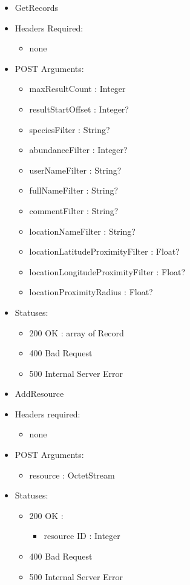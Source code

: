 \begin{itemize}
        \item GetRecords
        \item Headers Required:
        \begin{itemize}
        	\item none
        \end{itemize}
        \item POST Arguments:
        \begin{itemize}
            \item maxResultCount : Integer
            \item resultStartOffset : Integer?
        	\item speciesFilter : String?
            \item abundanceFilter : Integer?
            \item userNameFilter : String?
            \item fullNameFilter : String?
            \item commentFilter : String?
            \item locationNameFilter : String?
            \item locationLatitudeProximityFilter : Float?
            \item locationLongitudeProximityFilter : Float?
            \item locationProximityRadius : Float?
        \end{itemize}
        \item Statuses: 
        \begin{itemize}
        	\item 200 OK : array of Record
        	\item 400 Bad Request
        	\item 500 Internal Server Error
        \end{itemize}

        \item AddResource
        \item Headers required: 
        \begin{itemize}
            \item none
        \end{itemize}
        \item POST Arguments:
        \begin{itemize}
        	\item resource : OctetStream
        \end{itemize}
        \item Statuses:
        \begin{itemize}
        	\item 200 OK :
            \begin{itemize}
        		\item resource ID : Integer
            \end{itemize}
        	\item 400 Bad Request
        	\item 500 Internal Server Error
        \end{itemize}


\end{itemize}
